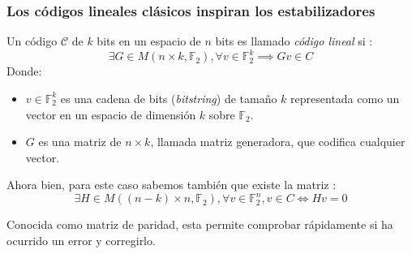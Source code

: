 \begin{frame}
  \frametitle{Los códigos lineales clásicos inspiran los estabilizadores}

  Un código $\mathcal{C}$ de $k$ bits en un espacio de $n$ bits es llamado \textit{código lineal} si \citep{Kitaev2002}:
  \begin{equation}
    \exists G \in M(n \times k, \mathbb{F}_2), \forall v \in \mathbb{F}_2^k \implies G v \in C
    \label{eq:linear_code}
  \end{equation}
  Donde:
  \begin{itemize}
    \item $v \in \mathbb{F}_2^k$ es una cadena de bits (\textit{bitstring}) de tamaño $k$ representada como un vector en un espacio de dimensión $k$ sobre $\mathbb{F}_2$.
    \item $G$ es una matriz de $n \times k$, llamada matriz generadora, que codifica cualquier vector.
  \end{itemize}

  Ahora bien, para este caso sabemos también que existe la matriz \citep{Nielsen2010}:
  \begin{equation}
    \exists H \in M((n - k) \times n, \mathbb{F}_2), \forall v \in \mathbb{F}_2^n, v \in C \iff H v = 0
    \label{eq:parity_matrix}
  \end{equation}

  Conocida como matriz de paridad, esta permite comprobar rápidamente si ha ocurrido un error y corregirlo.
\end{frame}


